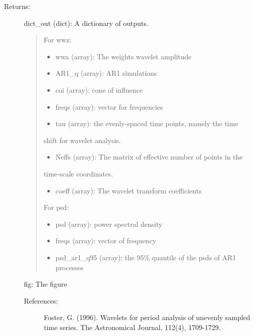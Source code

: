 \documentclass[letterpaper,10pt,english]{sphinxmanual}
\begin{document}
\begin{fulllineitems}
\begin{description}
\begin{description}
\end{description}

\item[{Returns:}] \leavevmode
dict\_out (dict): A dictionary of outputs.
\begin{quote}

For wwz:
\begin{itemize}
\item {} 
wwa (array): The weights wavelet amplitude

\item {} 
AR1\_q (array): AR1 simulations

\item {} 
coi (array): cone of influence

\item {} 
freqs (array): vector for frequencies

\item {} 
tau (array): the evenly-spaced time points, namely the time

\end{itemize}

shift for wavelet analysis.
\begin{itemize}
\item {} 
Neffs (array): The matrix of effective number of points in the

\end{itemize}

time-scale coordinates.
\begin{itemize}
\item {} 
coeff (array): The wavelet transform coefficients

\end{itemize}

For psd:
\begin{itemize}
\item {} 
psd (array): power spectral density

\item {} 
freqs (array): vector of frequency

\item {} 
psd\_ar1\_q95 (array): the 95\% quantile of the psds of AR1 processes

\end{itemize}
\end{quote}

fig: The figure
\begin{description}
\item[{References:}] \leavevmode
Foster, G. (1996). Wavelets for period analysis of unevenly 
sampled time series. The Astronomical Journal, 112(4), 1709-1729.


\end{description}
\end{description}
\end{fulllineitems}
\end{document}
